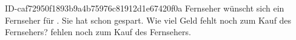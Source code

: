 \begin{exercise}
      {ID-caf72950f1893b9a4b75976c81912d1e67420f0a}
      {Fernseher}
  \ifproblem\problem
    \xxa{} wünscht sich ein Fernseher für . Sie hat schon  gespart.
    Wie viel Geld fehlt noch zum Kauf des Fernsehers?
  \fi
  \ifoutcome\outcome
    \xxa{} fehlen noch  zum Kauf des Fernsehers.
  \fi
\end{exercise}
